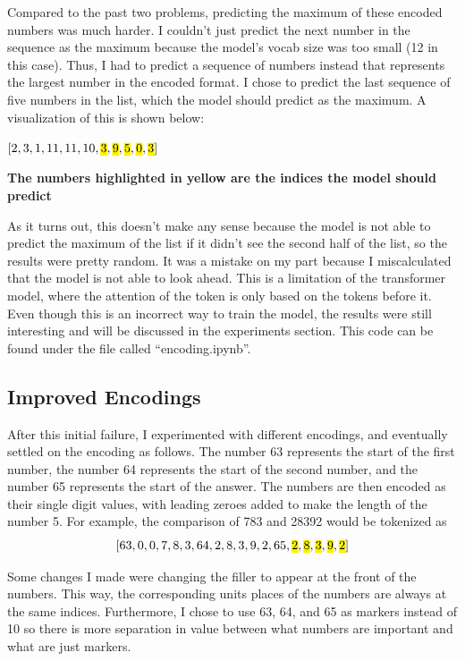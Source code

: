 \documentclass{article}
\begin{document}
Compared to the past two problems, predicting the maximum of these encoded numbers was much harder. I couldn't just predict the next number in the sequence as the maximum because the model's vocab size was too small (12 in this case). Thus, I had to predict a sequence of numbers instead that represents the largest number in the encoded format. I chose to predict the last sequence of five numbers in the list, which the model should predict as the maximum. A visualization of this is shown below:

\begin{center}
    $[2, 3, 1, 11, 11, 10, \text{\hl{3}}, \text{\hl{9}}, \text{\hl{5}}, \text{\hl{0}}, \text{\hl{3}}]$

    \textbf{The numbers highlighted in yellow are the indices the model should predict}
\end{center}

As it turns out, this doesn't make any sense because the model is not able to predict the maximum of the list if it didn't see the second half of the list, so the results were pretty random. It was a mistake on my part because I miscalculated that the model is not able to look ahead. This is a limitation of the transformer model, where the attention of the token is only based on the tokens before it. Even though this is an incorrect way to train the model, the results were still interesting and will be discussed in the experiments section. This code can be found under the file called ``encoding.ipynb''. 

\subsection{Improved Encodings}
After this initial failure, I experimented with different encodings, and eventually settled on the encoding as follows. The number 63 represents the start of the first number, the number 64 represents the start of the second number, and the number 65 represents the start of the answer. The numbers are then encoded as their single digit values, with leading zeroes added to make the length of the number 5. For example, the comparison of 783 and 28392 would be tokenized as
$$
[63, 0, 0, 7, 8, 3, 64, 2, 8, 3, 9, 2, 65, \text{\hl{2}}, \text{\hl{8}}, \text{\hl{3}}, \text{\hl{9}}, \text{\hl{2}}]
$$

Some changes I made were changing the filler to appear at the front of the numbers. This way, the corresponding units places of the numbers are always at the same indices. Furthermore, I chose to use 63, 64, and 65 as markers instead of 10 so there is more separation in value between what numbers are important and what are just markers. 
\end{document}
